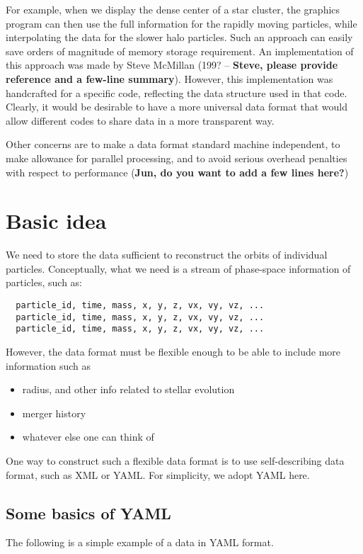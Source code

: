 \documentclass{elsart5p}
\begin{document}
For example, when we display the dense center of a star cluster,
the graphics program can then use the full information for the rapidly
moving particles, while interpolating the data for the slower halo
particles.  Such an approach can easily save orders of magnitude of
memory storage requirement.  An implementation of this approach was
made by Steve McMillan (199? -- {\bf Steve, please provide reference
and a few-line summary}).  However, this implementation was handcrafted
for a specific code, reflecting the data structure used in that code.
Clearly, it would be desirable to have a more universal data format
that would allow different codes to share data in a more transparent
way.

Other concerns are to make a data format standard machine independent,
to make allowance for parallel processing, and to avoid serious overhead
penalties with respect to performance ({\bf Jun, do you want to add a
few lines here?})

\section{Basic idea}

We need to store the data sufficient to reconstruct the orbits of
individual particles. Conceptually, what we need is a stream of
phase-space information of particles, such as:
\begin{verbatim}
  particle_id, time, mass, x, y, z, vx, vy, vz, ...
  particle_id, time, mass, x, y, z, vx, vy, vz, ...
  particle_id, time, mass, x, y, z, vx, vy, vz, ...
\end{verbatim}
However, the data format must be flexible enough to be able to include
more information such as
\begin{itemize}
  \item radius, and other info related to stellar evolution
  \item merger history
  \item whatever else one can think of
\end{itemize}

One way to construct such a flexible data format is to use
self-describing data format, such as XML or YAML. For simplicity,
we adopt YAML here.

\subsection{Some basics of YAML}

The following is a simple example of a data in YAML format.
\end{document}
